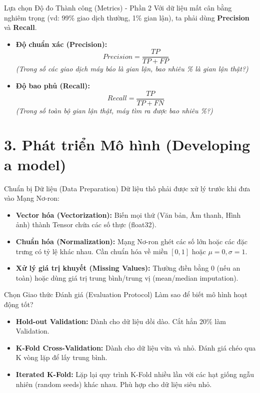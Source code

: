 \documentclass[aspectratio=169]{beamer}
\begin{document}
\begin{frame}{Lựa chọn Độ đo Thành công (Metrics) - Phần 2}
    Với dữ liệu mất cân bằng nghiêm trọng (vd: 99\% giao dịch thường, 1\% gian lận), ta phải dùng \textbf{Precision} và \textbf{Recall}.
    \begin{itemize}
        \item \textbf{Độ chuẩn xác (Precision):}
        \begin{equation}
            Precision = \frac{TP}{TP + FP}
        \end{equation}
        \textit{(Trong số các giao dịch máy báo là gian lận, bao nhiêu \% là gian lận thật?)}
        
        \item \textbf{Độ bao phủ (Recall):}
        \begin{equation}
            Recall = \frac{TP}{TP + FN}
        \end{equation}
        \textit{(Trong số toàn bộ gian lận thật, máy tìm ra được bao nhiêu \%?)}
    \end{itemize}
\end{frame}

\section{3. Phát triển Mô hình (Developing a model)}

\begin{frame}{Chuẩn bị Dữ liệu (Data Preparation)}
    Dữ liệu thô phải được xử lý trước khi đưa vào Mạng Nơ-ron:
    \begin{itemize}
        \item \textbf{Vector hóa (Vectorization):} Biến mọi thứ (Văn bản, Âm thanh, Hình ảnh) thành Tensor chứa các số thực (float32).
        \item \textbf{Chuẩn hóa (Normalization):} Mạng Nơ-ron ghét các số lớn hoặc các đặc trưng có tỷ lệ khác nhau. Cần chuẩn hóa về miền $[0, 1]$ hoặc $\mu=0, \sigma=1$.
        \item \textbf{Xử lý giá trị khuyết (Missing Values):} Thường điền bằng $0$ (nếu an toàn) hoặc dùng giá trị trung bình/trung vị (mean/median imputation).
    \end{itemize}
\end{frame}

\begin{frame}{Chọn Giao thức Đánh giá (Evaluation Protocol)}
    Làm sao để biết mô hình hoạt động tốt?
    \begin{itemize}
        \item \textbf{Hold-out Validation:} Dành cho dữ liệu dồi dào. Cắt hẳn $20\%$ làm Validation.
        \item \textbf{K-Fold Cross-Validation:} Dành cho dữ liệu vừa và nhỏ. Đánh giá chéo qua K vòng lặp để lấy trung bình.
        \item \textbf{Iterated K-Fold:} Lặp lại quy trình K-Fold nhiều lần với các hạt giống ngẫu nhiên (random seeds) khác nhau. Phù hợp cho dữ liệu siêu nhỏ.
    \end{itemize}
\end{frame}
\end{document}
